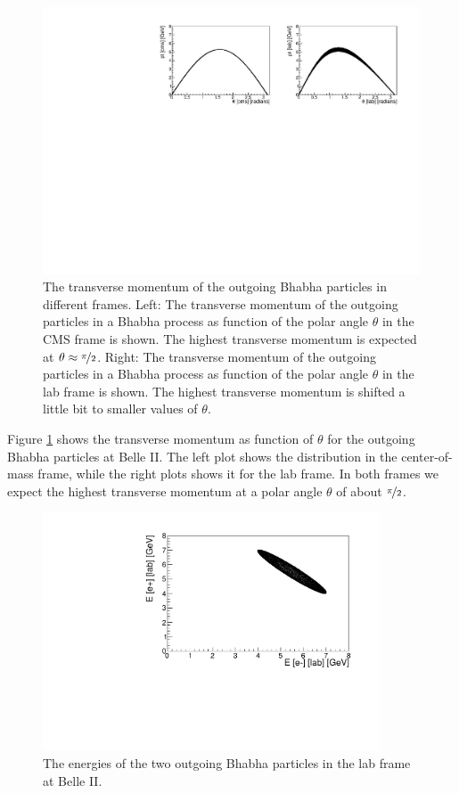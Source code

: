 \documentclass[a4paper,11pt,twosided,final,german,openbib,pdftex,listof=totoc,bibliography=totoc]{scrbook}
\begin{document}
\begin{figure}[h!]
	\centering
	\includegraphics[width=\textwidth]{Bilder/CptTheta}
	\caption[Transverse Momentum As Function Of $\theta$ In The CMS And LAB Frame]{The transverse momentum of the outgoing Bhabha particles in different frames. Left: The transverse momentum of the outgoing particles in a Bhabha process as function of the polar angle $\theta$ in the CMS frame is shown. The highest transverse momentum is expected at $\theta \approx \nicefrac{\pi}{2}$. Right: The transverse momentum of the outgoing particles in a Bhabha process as function of the polar angle $\theta$ in the lab frame is shown. The highest transverse momentum is shifted a little bit to smaller values of $\theta$.}
	\label{fig:Belle IItMomentum}
\end{figure}


Figure \ref{fig:Belle IItMomentum} shows the transverse momentum as function of $\theta$ for the outgoing Bhabha particles at Belle II. The left plot shows the distribution in the center-of-mass frame, while the right plots shows it for the lab frame. In both frames we expect the highest transverse momentum at a polar angle $\theta$ of about $\nicefrac{\pi}{2}$.



\begin{figure}[h!]
	\centering
	\includegraphics[width=10cm]{Bilder/ee}
	\caption[Energies Of The Outgoing Particles In The LAB Frame]{The energies of the two outgoing Bhabha particles in the lab frame at Belle II.}
	\label{fig:EvsE}
\end{figure}
\end{document}
